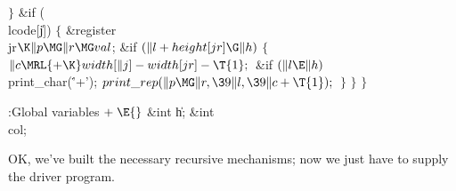 \4${}\}{}$\2\6
\&{if} (\\{lcode}[\|j])\5
${}\{{}$\1\6
\&{register} \\{jr}${}\K\|p\MG\|r\MG\\{val}{}$;\7
\&{if} ${}(\|l+\\{height}[\\{jr}]\G\|h){}$\5
${}\{{}$\1\6
${}\|c\MRL{+{\K}}\\{width}[\|j]-\\{width}[\\{jr}]-\T{1};{}$\6
\&{if} ${}(\|l\E\|h){}$\1\5
\\{print\_char}(\.{'+'});\2\6
${}\\{print\_rep}(\|p\MG\|r,\39\|l,\39\|c+\T{1});{}$\6
\4${}\}{}$\2\6
\4${}\}{}$\2\6
\4${}\}{}$\2\par
\fi

\B{}:Global variables\X${}\mathrel+\E{}$\6
\&{int} \|h;\6
\&{int} \\{col};\par
\fi

OK, we've built the necessary recursive mechanisms; now we just have
to supply the driver program.

